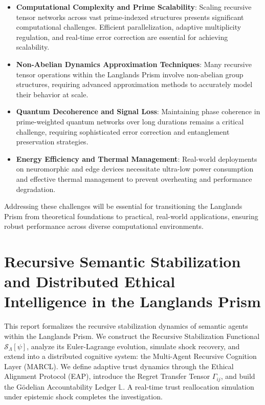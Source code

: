 \documentclass[11pt]{article}
\begin{document}
\begin{itemize}
    \item \textbf{Computational Complexity and Prime Scalability}:
    Scaling recursive tensor networks across vast prime-indexed structures presents significant computational challenges. Efficient parallelization, adaptive multiplicity regulation, and real-time error correction are essential for achieving scalability.

    \item \textbf{Non-Abelian Dynamics Approximation Techniques}:
    Many recursive tensor operations within the Langlands Prism involve non-abelian group structures, requiring advanced approximation methods to accurately model their behavior at scale.

    \item \textbf{Quantum Decoherence and Signal Loss}:
    Maintaining phase coherence in prime-weighted quantum networks over long durations remains a critical challenge, requiring sophisticated error correction and entanglement preservation strategies.

    \item \textbf{Energy Efficiency and Thermal Management}:
    Real-world deployments on neuromorphic and edge devices necessitate ultra-low power consumption and effective thermal management to prevent overheating and performance degradation.
\end{itemize}

Addressing these challenges will be essential for transitioning the Langlands Prism from theoretical foundations to practical, real-world applications, ensuring robust performance across diverse computational environments.


\section{Recursive Semantic Stabilization and Distributed Ethical Intelligence in the Langlands Prism}


This report formalizes the recursive stabilization dynamics of semantic agents within the Langlands Prism. We construct the Recursive Stabilization Functional $\mathcal{S}_{\Lambda}[\psi]$, analyze its Euler-Lagrange evolution, simulate shock recovery, and extend into a distributed cognitive system: the Multi-Agent Recursive Cognition Layer (MARCL). We define adaptive trust dynamics through the Ethical Alignment Protocol (EAP), introduce the Regret Transfer Tensor $\Gamma_{ij}$, and build the Gödelian Accountability Ledger $\mathbb{L}$. A real-time trust reallocation simulation under epistemic shock completes the investigation.
\end{document}
